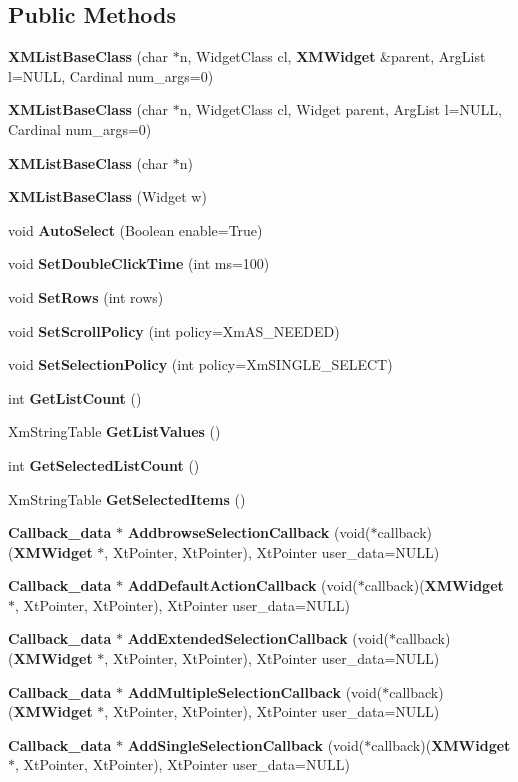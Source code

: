 \subsection*{Public Methods}
\begin{CompactItemize}
\item 
{\bf XMList\-Base\-Class} (char $\ast$n, Widget\-Class cl, {\bf XMWidget} \&parent, Arg\-List l=NULL, Cardinal num\_\-args=0)
\item 
{\bf XMList\-Base\-Class} (char $\ast$n, Widget\-Class cl, Widget parent, Arg\-List l=NULL, Cardinal num\_\-args=0)
\item 
{\bf XMList\-Base\-Class} (char $\ast$n)
\item 
{\bf XMList\-Base\-Class} (Widget w)
\item 
void {\bf Auto\-Select} (Boolean enable=True)
\item 
void {\bf Set\-Double\-Click\-Time} (int ms=100)
\item 
void {\bf Set\-Rows} (int rows)
\item 
void {\bf Set\-Scroll\-Policy} (int policy=Xm\-AS\_\-NEEDED)
\item 
void {\bf Set\-Selection\-Policy} (int policy=Xm\-SINGLE\_\-SELECT)
\item 
int {\bf Get\-List\-Count} ()
\item 
Xm\-String\-Table {\bf Get\-List\-Values} ()
\item 
int {\bf Get\-Selected\-List\-Count} ()
\item 
Xm\-String\-Table {\bf Get\-Selected\-Items} ()
\item 
{\bf Callback\_\-data} $\ast$ {\bf Addbrowse\-Selection\-Callback} (void($\ast$callback)({\bf XMWidget} $\ast$, Xt\-Pointer, Xt\-Pointer), Xt\-Pointer user\_\-data=NULL)
\item 
{\bf Callback\_\-data} $\ast$ {\bf Add\-Default\-Action\-Callback} (void($\ast$callback)({\bf XMWidget} $\ast$, Xt\-Pointer, Xt\-Pointer), Xt\-Pointer user\_\-data=NULL)
\item 
{\bf Callback\_\-data} $\ast$ {\bf Add\-Extended\-Selection\-Callback} (void($\ast$callback)({\bf XMWidget} $\ast$, Xt\-Pointer, Xt\-Pointer), Xt\-Pointer user\_\-data=NULL)
\item 
{\bf Callback\_\-data} $\ast$ {\bf Add\-Multiple\-Selection\-Callback} (void($\ast$callback)({\bf XMWidget} $\ast$, Xt\-Pointer, Xt\-Pointer), Xt\-Pointer user\_\-data=NULL)
\item 
{\bf Callback\_\-data} $\ast$ {\bf Add\-Single\-Selection\-Callback} (void($\ast$callback)({\bf XMWidget} $\ast$, Xt\-Pointer, Xt\-Pointer), Xt\-Pointer user\_\-data=NULL)

\end{CompactItemize}
